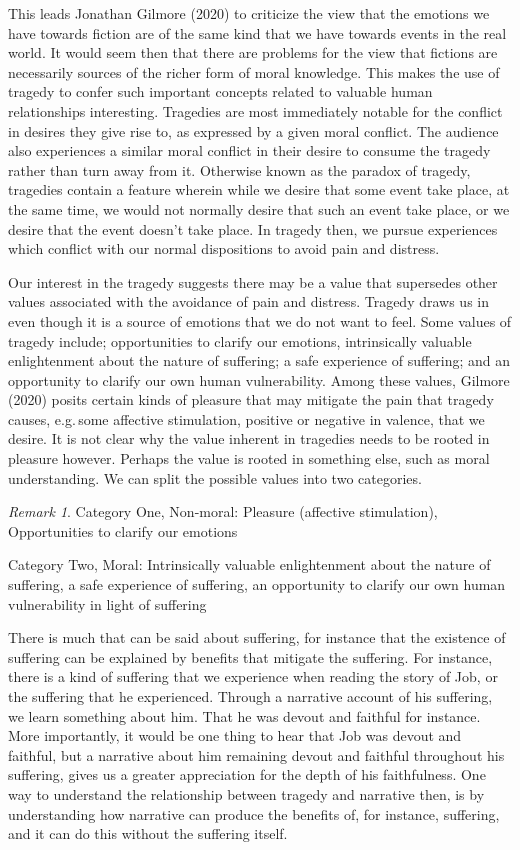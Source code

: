 \documentclass[12pt]{book}
\theoremstyle{definition}
\theoremstyle{remark}
\newtheorem{remark}[theorem]{Remark}
\begin{document}
This leads Jonathan Gilmore (2020) to criticize the view that the emotions we have towards fiction are of the same kind that we have towards events in the real world. It would seem then that there are problems for the view that fictions are necessarily sources of the richer form of moral knowledge. This makes the use of tragedy to confer such important concepts related to valuable human relationships interesting. Tragedies are most immediately notable for the conflict in desires they give rise to, as expressed by a given moral conflict. The audience also experiences a similar moral conflict in their desire to consume the tragedy rather than turn away from it. Otherwise known as the paradox of tragedy, tragedies contain a feature wherein while we desire that some event take place, at the same time, we would not normally desire that such an event take place, or we desire that the event doesn't take place. In tragedy then, we pursue experiences which conflict with our normal dispositions to avoid pain and distress.

Our interest in the tragedy suggests there may be a value that supersedes other values associated with the avoidance of pain and distress. Tragedy draws us in even though it is a source of emotions that we do not want to feel. Some values of tragedy include; opportunities to clarify our emotions, intrinsically valuable enlightenment about the nature of suffering; a safe experience of suffering; and an opportunity to clarify our own human vulnerability. Among these values, Gilmore (2020) posits certain kinds of pleasure that may mitigate the pain that tragedy causes, e.g.\,some affective stimulation, positive or negative in valence, that we desire. It is not clear why the value inherent in tragedies needs to be rooted in pleasure however. Perhaps the value is rooted in something else, such as moral understanding. We can split the possible values into two categories.

\begin{remark}
Category One, Non-moral: Pleasure (affective stimulation), Opportunities to clarify our emotions

Category Two, Moral: Intrinsically valuable enlightenment about the nature of suffering, a safe experience of suffering, an opportunity to clarify our own human vulnerability in light of suffering
\end{remark}

There is much that can be said about suffering, for instance that the existence of suffering can be explained by benefits that mitigate the suffering. For instance, there is a kind of suffering that we experience when reading the story of Job, or the suffering that he experienced. Through a narrative account of his suffering, we learn something about him. That he was devout and faithful for instance. More importantly, it would be one thing to hear that Job was devout and faithful, but a narrative about him remaining devout and faithful throughout his suffering, gives us a greater appreciation for the depth of his faithfulness. One way to understand the relationship between tragedy and narrative then, is by understanding how narrative can produce the benefits of, for instance, suffering, and it can do this without the suffering itself.
\end{document}
